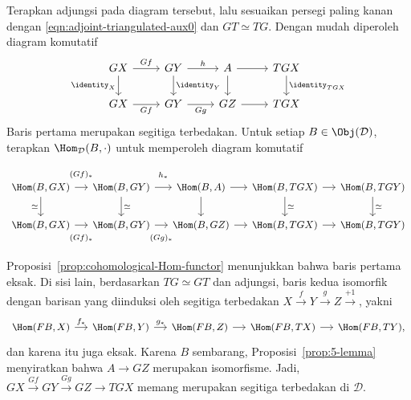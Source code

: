 \begin{bukti}
	Terapkan adjungsi pada diagram tersebut, lalu sesuaikan persegi paling kanan
	dengan \eqref{eqn:adjoint-triangulated-aux0} dan $GT \simeq TG$. Dengan
	mudah diperoleh diagram komutatif
	\[\begin{tikzcd}
		GX \arrow[r, "Gf"] \arrow[d, "\identity_X"'] & GY \arrow[d, "\identity_Y"] \arrow[r, "h"] & A \arrow[r] \arrow[d] & TGX \arrow[d, "\identity_{TGX}"] \\
		GX \arrow[r, "Gf"'] & GY \arrow[r, "Gg"'] & GZ \arrow[r] & TGX
	\end{tikzcd}\]
	Baris pertama merupakan segitiga terbedakan. Untuk setiap
	$B \in \Obj(\mathcal{D})$, terapkan $\Hom_{\mathcal{D}}(B, \cdot)$ untuk
	memperoleh diagram komutatif
	\[\begin{tikzcd}[column sep=small, every cell/.append style={font=\small}]
		\Hom(B, GX) \arrow[r, "(Gf)_*" inner sep=0.8em] \arrow[d, "\simeq"'] & \Hom(B, GY) \arrow[r, "h_*" inner sep=0.8em] \arrow[d, "\simeq"] & \Hom(B, A) \arrow[d] \arrow[r] & \Hom(B, TGX) \arrow[r] \arrow[d, "\simeq"] & \Hom(B, TGY) \arrow[d, "\simeq"] \\
		\Hom(B, GX) \arrow[r, "(Gf)_*"' inner sep=0.8em] & \Hom(B, GY) \arrow[r, "(Gg)_*"' inner sep=0.8em] & \Hom(B, GZ) \arrow[r] & \Hom(B, TGX) \arrow[r] & \Hom(B, TGY)
	\end{tikzcd}\]
	Proposisi~\ref{prop:cohomological-Hom-functor} menunjukkan bahwa baris
	pertama eksak. Di sisi lain, berdasarkan $TG \simeq GT$ dan adjungsi, baris
	kedua isomorfik dengan barisan yang diinduksi oleh segitiga terbedakan
	$X \xrightarrow{f} Y \xrightarrow{g} Z \xrightarrow{+1}$, yakni
	\[\begin{tikzcd}[column sep=small, every cell/.append style = {font = \small}]
		\Hom(FB, X) \arrow[r, "f_*"] & \Hom(FB, Y) \arrow[r, "g_*"] & \Hom(FB, Z) \arrow[r] & \Hom(FB, TX) \arrow[r] & \Hom(FB, TY) ,
	\end{tikzcd}\]
	dan karena itu juga eksak. Karena $B$ sembarang,
	Proposisi~\ref{prop:5-lemma} menyiratkan bahwa $A \to GZ$ merupakan
	isomorfisme. Jadi,
	$GX \xrightarrow{Gf} GY \xrightarrow{Gg} GZ \to TGX$ memang merupakan
	segitiga terbedakan di $\mathcal{D}$.
\end{bukti}

